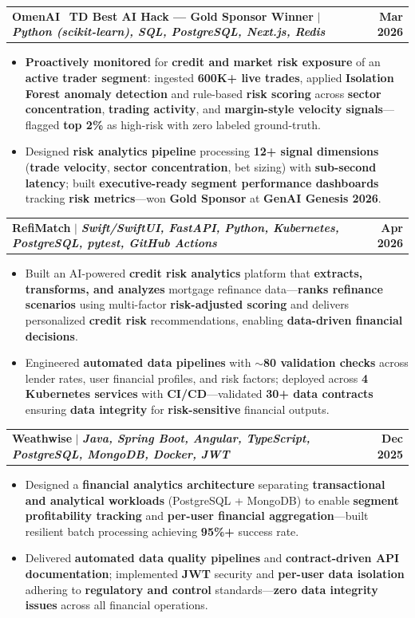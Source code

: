 \documentclass[letterpaper,10pt]{article}
\makeatletter
\newcommand{\resumeItem}[1]{
  \item\small{
    {#1 \vspace{-1pt}}
  }
}
\newcommand{\resumeProjectHeading}[2]{
    \item
    \begin{tabular*}{1.001\textwidth}{l@{\extracolsep{\fill}}r}
      \small#1 & \textbf{\small #2}\\
    \end{tabular*}\vspace{-9pt}
}
\newcommand{\resumeItemListStart}{\begin{itemize}[leftmargin=0.15in]}
\newcommand{\resumeItemListEnd}{\end{itemize}\vspace{-4pt}}
\makeatother
\begin{document}
    \resumeProjectHeading
          {\textbf{OmenAI} \textbar\ \textbf{TD Best AI Hack --- Gold Sponsor Winner} $|$ \emph{\textbf{Python (scikit-learn), SQL, PostgreSQL, Next.js, Redis}}}{Mar 2026}
    \resumeItemListStart
        \resumeItem{\textbf{Proactively monitored} for \textbf{credit and market risk exposure} of an \textbf{active trader segment}: ingested \textbf{600K+ live trades}, applied \textbf{Isolation Forest anomaly detection} and rule-based \textbf{risk scoring} across \textbf{sector concentration}, \textbf{trading activity}, and \textbf{margin-style velocity signals}---flagged \textbf{top 2\%} as high-risk with zero labeled ground-truth.}
        \vspace{-2pt}
        \resumeItem{Designed \textbf{risk analytics pipeline} processing \textbf{12+ signal dimensions} (\textbf{trade velocity}, \textbf{sector concentration}, bet sizing) with \textbf{sub-second latency}; built \textbf{executive-ready segment performance dashboards} tracking \textbf{risk metrics}---won \textbf{Gold Sponsor} at \textbf{GenAI Genesis 2026}.}
    \resumeItemListEnd
    \vspace{-18pt}

    \resumeProjectHeading
          {\textbf{RefiMatch} $|$ \emph{\textbf{Swift/SwiftUI, FastAPI, Python, Kubernetes, PostgreSQL, pytest, GitHub Actions}}}{Apr 2026}
          \resumeItemListStart
            \resumeItem{Built an AI-powered \textbf{credit risk analytics} platform that \textbf{extracts, transforms, and analyzes} mortgage refinance data---\textbf{ranks refinance scenarios} using multi-factor \textbf{risk-adjusted scoring} and delivers personalized \textbf{credit risk} recommendations, enabling \textbf{data-driven financial decisions}.}
            \vspace{-2pt}
            \resumeItem{Engineered \textbf{automated data pipelines} with \textbf{$\sim$80 validation checks} across lender rates, user financial profiles, and risk factors; deployed across \textbf{4 Kubernetes services} with \textbf{CI/CD}---validated \textbf{30+ data contracts} ensuring \textbf{data integrity} for \textbf{risk-sensitive} financial outputs.}
          \resumeItemListEnd
    \vspace{-18pt}

    \resumeProjectHeading
          {\textbf{Weathwise} $|$ \emph{\textbf{Java, Spring Boot, Angular, TypeScript, PostgreSQL, MongoDB, Docker, JWT}}}{Dec 2025}
          \resumeItemListStart
            \resumeItem{Designed a \textbf{financial analytics architecture} separating \textbf{transactional and analytical workloads} (PostgreSQL + MongoDB) to enable \textbf{segment profitability tracking} and \textbf{per-user financial aggregation}---built resilient batch processing achieving \textbf{95\%+} success rate.}
            \vspace{-2pt}
            \resumeItem{Delivered \textbf{automated data quality pipelines} and \textbf{contract-driven API documentation}; implemented \textbf{JWT} security and \textbf{per-user data isolation} adhering to \textbf{regulatory and control} standards---\textbf{zero data integrity issues} across all financial operations.}
          \resumeItemListEnd
    \vspace{-8pt}
\end{document}

